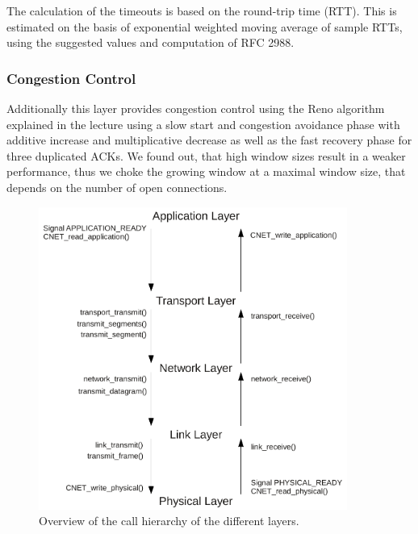   The calculation of the timeouts is based on the round-trip time (RTT). This is estimated on the basis of exponential weighted moving average of sample RTTs, using the suggested values and computation of RFC 2988.
  
  \subsubsection{Congestion Control}
  Additionally this layer provides congestion control using the Reno algorithm explained in the lecture using a slow start and congestion avoidance phase with additive increase and multiplicative decrease as well as the fast recovery phase for three duplicated ACKs. We found out, that high window sizes result in a weaker performance, thus we choke the growing window at a maximal window size, that depends on the number of open connections.

  \begin{figure}[h]
    \centering
    \includegraphics[width=0.9\textwidth]{images/flowgraph_overview.pdf}
    \caption[Overview Layers]{ Overview of the call hierarchy of the different layers.}
    \label{fig:overview-layers}
  \end{figure}

  \newpage


